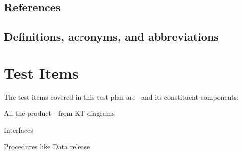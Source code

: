\subsection{References}

\renewcommand{\refname}{}


\subsection{Definitions, acronyms, and abbreviations \label{sect:acronyms}} 


\section{Test Items}

The test items covered in this test plan are \product \ and its constituent components:

\begin{itemize_single}
\item All the product - from KT diagrams

\item Interfaces  
\item Procedures like Data release 
\end{itemize_single}


